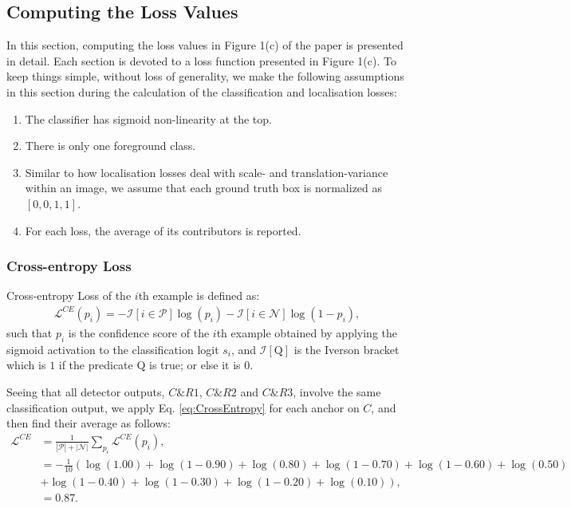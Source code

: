 \documentclass{article}
\begin{document}
\subsection{Computing the Loss Values}
\label{subsec:loss_est}
In this section, computing the loss values in Figure 1(c) of the paper is presented in detail. Each section is devoted to a loss function presented in  Figure 1(c). To keep things simple, without loss of generality, we make the following assumptions in this section during the calculation of the classification and localisation losses:

\begin{enumerate}
    \item The classifier has sigmoid non-linearity at the top.
    \item There is only one foreground class.
    \item Similar to how localisation losses deal with scale- and translation-variance within an image, we assume that each ground truth box is normalized as $[0, 0, 1, 1]$.
    \item For each loss, the average of its contributors is reported.
\end{enumerate}

\subsubsection{Cross-entropy Loss}
Cross-entropy Loss of the $i$th example is defined as:
\begin{align}
    \label{eq:CrossEntropy}
    \mathcal{L}^{CE} (p_i) = - \mathcal{I}[i \in \mathcal{P}] \log (p_i) - \mathcal{I}[i \in \mathcal{N}] \log (1-p_i),
\end{align}
such that $p_i$ is the confidence score of the $i$th example obtained by applying the sigmoid activation to the classification logit $s_i$, and $\mathcal{I}[\mathrm{Q}]$ is the Iverson bracket which is $1$ if the predicate $\mathrm{Q}$ is true; or else it is $0$.

Seeing that all detector outputs, $C\&R1$, $C\&R2$ and $C\&R3$, involve the same classification output, we apply Eq. \eqref{eq:CrossEntropy} for each anchor on $C$, and then find their average as follows:
\begin{align}
    \mathcal{L}^{CE} &=\frac{1}{|\mathcal{P}|+|\mathcal{N}|} \sum_{p_i} \mathcal{L}^{CE}(p_i) ,\\
    &=-\frac{1}{10} \left( \log(1.00) + \log(1-0.90)+ \log(0.80) +\log(1-0.70) +\log(1-0.60)+ \log(0.50) \right. \\
    & \left. + \log(1-0.40)+\log(1-0.30)+\log(1-0.20) + \log(0.10) \right),\\
    &=0.87.
\end{align}
\end{document}
